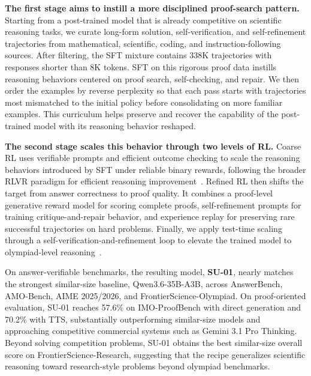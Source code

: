 \textbf{The first stage aims to instill a more disciplined proof-search pattern.} 
Starting from a post-trained model that is already competitive on scientific reasoning tasks,
we curate long-form solution, self-verification, and self-refinement
trajectories from mathematical, scientific, coding, and instruction-following
sources. 
After filtering, the SFT mixture contains 338K
trajectories with responses shorter than 8K tokens. SFT on this rigorous proof
data instills reasoning behaviors centered on proof search, self-checking, and
repair. We then order the examples by reverse perplexity so
that each pass starts with trajectories most mismatched to the initial policy
before consolidating on more familiar examples. This curriculum helps preserve
and recover the capability of the post-trained model with its reasoning
behavior reshaped.

\textbf{The second stage scales this behavior through two levels of RL.}
Coarse RL uses
verifiable prompts and efficient outcome checking to scale the reasoning
behaviors introduced by SFT under reliable binary rewards, following the broader RLVR paradigm for efficient reasoning improvement~\citep{r1,shao2024deepseekmath}. 
Refined RL then shifts the target from answer correctness to proof quality.  It combines a proof-level generative reward model for scoring complete proofs,
self-refinement prompts for training critique-and-repair behavior, and
experience replay for preserving rare successful trajectories on hard
problems.
Finally, we apply test-time scaling through a self-verification-and-refinement loop to elevate the trained
model to olympiad-level reasoning~\citep{huang2025winning}.


On answer-verifiable benchmarks, the resulting model,
\textbf{\textcolor{iclrdeepblue}{SU-01}}, nearly matches the strongest
similar-size baseline, Qwen3.6-35B-A3B, across AnswerBench, AMO-Bench, AIME
2025/2026, and FrontierScience-Olympiad. On proof-oriented evaluation, SU-01
reaches 57.6\% on IMO-ProofBench with direct generation and 70.2\% with TTS,
substantially outperforming similar-size models and approaching competitive
commercial systems such as Gemini 3.1 Pro Thinking. Beyond solving
competition problems, SU-01 obtains the best similar-size overall score on
FrontierScience-Research, suggesting that the recipe generalizes scientific
reasoning toward research-style problems beyond olympiad benchmarks.

